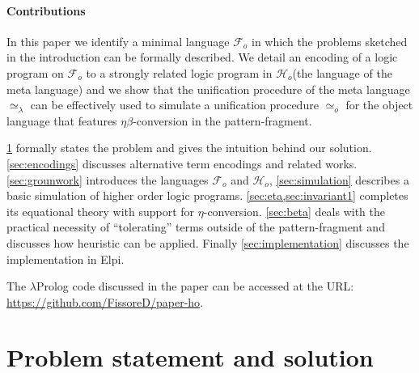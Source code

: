 \documentclass[sigconf,natbib=false,review]{acmart}
\newcommand{\UnifRel}{\ensuremath{\simeq}}
\newcommand{\nUnifRel}{\ensuremath{\not\simeq}}
\newcommand{\Uo}{\ensuremath{\UnifRel_o}\xspace}
\newcommand{\Ue}{\ensuremath{\UnifRel_\lambda}\xspace}
\newcommand{\nUe}{\ensuremath{\nUnifRel_\lambda}\xspace}
\newcommand{\Fo}{\ensuremath{\mathcal{F}_{\!o}\xspace}} %
\newcommand{\Ho}{\ensuremath{\mathcal{H}_o}\xspace}
\begin{document}
%
\paragraph{Contributions}
In this paper we identify a minimal language \Fo{} in which the problems
sketched in the introduction can be formally described.
We detail an encoding of a logic program on \Fo{} to a strongly related
logic program in \Ho (the language of the meta language) and we show that
the unification procedure of the meta language \Ue{} can be effectively
used to simulate a unification procedure \Uo for the object language that
features $\eta\beta$-conversion in the pattern-fragment.

\cref{sec:problem-statement} formally states the problem and gives the
intuition behind our solution. \cref{sec:encodings} discusses alternative
term encodings and related works. \cref{sec:grounwork} introduces
the languages \Fo{} and \Ho{}, \cref{sec:simulation} describes a
basic simulation of higher order logic programs.
\cref{sec:eta,sec:invariant1} completes its equational theory
with support for $\eta$-conversion. \cref{sec:beta} deals with the
practical necessity of ``tolerating'' terms outside of the
pattern-fragment and discusses how heuristic can be applied.
Finally \cref{sec:implementation} discusses the implementation in Elpi.

The $\lambda$Prolog code discussed in the paper can be accessed at the
URL: \url{https://github.com/FissoreD/paper-ho}.

\section{Problem statement and solution} %
\label{sec:problem-statement}
\end{document}
